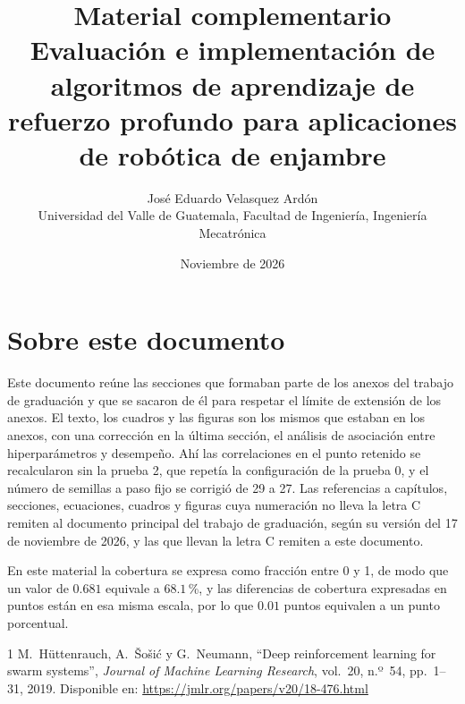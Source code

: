 \documentclass[12pt,letterpaper]{article}
\title{Material complementario\\[0.4em]
\large Evaluación e implementación de algoritmos de aprendizaje de refuerzo
profundo para aplicaciones de robótica de enjambre}
\author{José Eduardo Velasquez Ardón\\
\small Universidad del Valle de Guatemala, Facultad de Ingeniería,
Ingeniería Mecatrónica}
\date{Noviembre de 2026}
\begin{document}
\maketitle

\section*{Sobre este documento}

Este documento reúne las secciones que formaban parte de los anexos del trabajo
de graduación y que se sacaron de él para respetar el límite de extensión de los
anexos. El texto, los cuadros y las figuras son los mismos que estaban en los
anexos, con una corrección en la última sección, el análisis de asociación
entre hiperparámetros y desempeño. Ahí las correlaciones en el punto retenido
se recalcularon sin la prueba 2, que repetía la configuración de la prueba 0, y
el número de semillas a paso fijo se corrigió de 29 a 27. Las referencias a capítulos, secciones, ecuaciones, cuadros y figuras
cuya numeración no lleva la letra C remiten al documento principal del trabajo
de graduación, según su versión del 17 de noviembre de 2026, y las que llevan la
letra C remiten a este documento.

En este material la cobertura se expresa como fracción entre 0 y 1, de modo que
un valor de $0{.}681$ equivale a $68{.}1$\,\%, y las diferencias de cobertura
expresadas en puntos están en esa misma escala, por lo que $0{.}01$ puntos
equivalen a un punto porcentual.



\begin{thebibliography}{1}
M.~Hüttenrauch, A.~Šošić y G.~Neumann, ``Deep reinforcement learning for swarm
systems'', \textit{Journal of Machine Learning Research}, vol.~20, n.º~54,
pp.~1--31, 2019. Disponible en: \url{https://jmlr.org/papers/v20/18-476.html}
\end{thebibliography}
\end{document}
